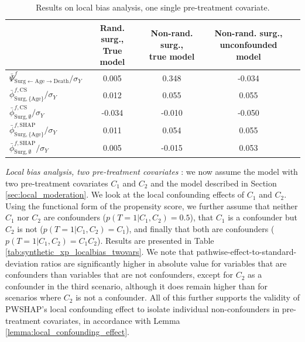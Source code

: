 \documentclass{article}
\theoremstyle{plain}
\theoremstyle{definition}
\theoremstyle{remark}
\newcommand{\effect}{\Psi}
\theoremstyle{mystyle}
\begin{document}
\begin{table}
\begin{tabular}{lcccc}
\hline
 & \makecell{Rand. surg., \\ True model}  & \makecell{Non-rand. surg.,\\ true model} & \makecell{Non-rand. surg.,\\ unconfounded model} \\ \hline
 $\bar{\effect}^f_{\text{Surg} \leftarrow \text{Age} \rightarrow \text{Death}} / \sigma_Y$ & 0.005 & 0.348 & -0.034 \\ \hline 
  $\bar{\phi}^{f,\text{CS}}_{\text{Surg}, \{\text{Age}\}} / \sigma_Y$ & 0.012 & 0.055 & 0.055 \\ \hline
    $\bar{\phi}^{f,\text{CS}}_{\text{Surg}, \emptyset} / \sigma_Y$ & -0.034 & -0.010 & -0.050 \\ \hline
  $\bar{\phi}^{f,\text{SHAP}}_{\text{Surg}, \{\text{Age}\}} / \sigma_Y$ & 0.011 & 0.054 & 0.055 \\ \hline
    $\bar{\phi}^{f,\text{SHAP}}_{\text{Surg}, \emptyset} / \sigma_Y$ & 0.005 & -0.015 & 0.053 \\ \hline
\end{tabular}
  \caption{Results on local bias analysis, one single pre-treatment covariate. %
  }%
\label{tab:synthetic_xp_localbias_singlevar}
\end{table}
    
\textit{Local bias analysis, two pre-treatment covariates} : we now assume the model with two pre-treatment covariates $C_1$ and $C_2$ and the model described in Section \ref{sec:local_moderation}. We look at the local confounding effects of $C_1$ and $C_2$. Using the functional form of the propensity score, we further assume that neither $C_1$ nor $C_2$ are confounders ($p(T=1|C_1,C_2) = 0.5$), that $C_1$ is a confounder but $C_2$ is not ($p(T=1|C_1,C_2) = C_1$), and finally that both are confounders ($p(T=1|C_1,C_2) = C_1C_2$). Results are presented in Table \ref{tab:synthetic_xp_localbias_twovars}. We note that pathwise-effect-to-standard-deviation ratios are significantly higher in absolute value for variables that are confounders than variables that are not confounders, except for $C_2$ as a confounder in the third scenario, although it does remain higher than for scenarios where $C_2$ is not a confounder. All of this further supports the validity of PWSHAP's local confounding effect to isolate individual non-confounders in pre-treatment covariates, in accordance with Lemma \ref{lemma:local_confounding_effect}.
    
\end{document}
